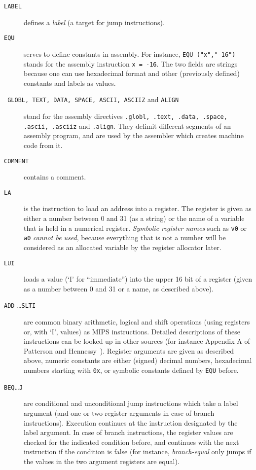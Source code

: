 \documentclass[11pt,a4paper]{article}
\newcommand{\codesize}{\scriptsize}
\newcommand{\cd}[1]{{{\codesize\tt #1}}}
\begin{document}
\begin{description}


\item[\texttt{LABEL}]
defines a \emph{label} (a target for jump instructions).

\item[\texttt{EQU}] 
  serves to define constants in assembly. For instance, \cd{EQU~("x","-16")}
  stands for the assembly instruction \cd{x = -16}. 
  The two fields are strings because one can use hexadecimal format 
  and other (previously defined) constants and labels as values.

\item[\texttt{ GLOBL, TEXT, DATA, SPACE, ASCII, ASCIIZ} and \texttt{ALIGN}] 
  stand for the assembly directives 
    \cd{.globl, .text, .data, .space, .ascii, .asciiz} and \cd{.align}. 
    They delimit different segments of an assembly program, and are used by the
    assembler which creates machine code from it.

\item[\texttt{COMMENT}] contains a comment.

\item[\texttt{LA}] is the instruction to load an address into a register.
	The register is given as either a number between 0 and 31 (as a string)
	or the name of a variable that is held in a numerical register.
	\emph{Symbolic register names} such as \cd{v0} or \cd{a0} \emph{cannot be used},
	because everything that is not a number will be considered as an allocated
	variable by the register allocator later.

\item[\texttt{LUI}] loads a value (`I' for ``immediate'') into the upper
	16 bit of a register (given as a number between 0 and 31 or a name, as 
	described above).

\item[\texttt{ADD} \ldots \texttt{SLTI}]
	are common binary arithmetic, logical and shift operations
	(using registers or, with `I', values) as MIPS instructions.
	Detailed descriptions of these instructions can be looked up 
	in other sources (for instance Appendix A of Patterson and
	 Hennessy~\cite{PattersonHennessy}).
	Register arguments are given as described above, numeric constants 
	are either (signed) decimal numbers, hexadecimal numbers starting 
	with \cd{0x}, or symbolic constants defined by \texttt{EQU} before.

\item[\texttt{BEQ}\ldots\texttt{J}] 
	are conditional and unconditional jump instructions which take a label
	argument (and one or two register arguments in case of branch instructions).
    Execution continues at the instruction designated 
	by the label argument. In case of branch instructions, the register
	values are checked for the indicated condition before, and continues
	with the next instruction if the condition is false (for instance,
	\emph{branch-equal} only jumps if the values in the two argument registers
	are equal).


\end{description}
\end{document}
